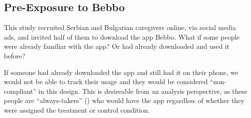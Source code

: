 \documentclass{article}
\begin{document}














\subsection*{Pre-Exposure to Bebbo}

This study recruited Serbian and Bulgarian caregivers online, via social media ads, and invited half of them to download the app Bebbo. What if some people were already familiar with the app? Or had already downloaded and used it before?

If someone had already downloaded the app and still had it on their phone, we would not be able to track their usage and they would be considered ``non-compliant'' in this design. This is desireable from an analysis perspective, as these people are ``always-takers'' (\cite{Imbens2015}) who would have the app regardless of whether they were assigned the treatment or control condition.
\end{document}
